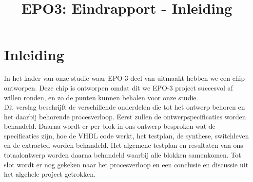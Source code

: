 \documentclass{scrartcl} %
\author{}
\title{EPO3: Eindrapport - Inleiding}
\begin{document}
\chapter{Inleiding}
\label{ch:inleiding}

In het kader van onze studie waar EPO-3 deel van uitmaakt hebben we een chip ontworpen. Deze chip is ontworpen omdat dit we EPO-3 project succesvol af willen ronden, en zo de punten kunnen behalen voor onze studie.\\
Dit verslag beschrijft de verschillende onderdelen die tot het ontwerp behoren en het daarbij behorende procesverloop. Eerst zullen de ontwerpspecificaties worden behandeld. Daarna wordt er per blok in ons ontwerp besproken wat de specificaties zijn, hoe de VHDL code werkt, het testplan, de synthese, switchleven en de extracted worden behandeld. Het algemene testplan en resultaten van ons totaalontwerp worden daarna behandeld waarbij alle blokken samenkomen. Tot slot wordt er nog gekeken naar het procesverloop en een conclusie en discussie uit het algehele project getrokken.
\end{document}
